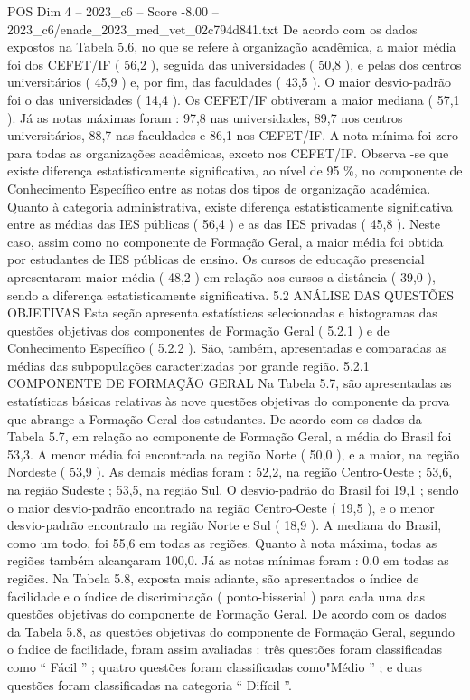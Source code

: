\begin{textsample}{POS Dim 4 – 2023\_c6 – Score -8.00 – 2023\_c6/enade\_2023\_med\_vet\_02c794d841.txt}
De acordo com os dados expostos na Tabela 5.6, no que se refere à organização acadêmica, a maior média foi dos CEFET/IF ( 56,2 ), seguida das universidades ( 50,8 ), e pelas dos centros universitários ( 45,9 ) e, por fim, das faculdades ( 43,5 ).
O maior desvio-padrão foi o das universidades ( 14,4 ).
Os CEFET/IF obtiveram a maior mediana ( 57,1 ).
Já as notas máximas foram : 97,8 nas universidades, 89,7 nos centros universitários, 88,7 nas faculdades e 86,1 nos CEFET/IF.
A nota mínima foi zero para todas as organizações acadêmicas, exceto nos CEFET/IF.
Observa -se que existe diferença estatisticamente significativa, ao nível de 95 \%, no componente de Conhecimento Específico entre as notas dos tipos de organização acadêmica.
Quanto à categoria administrativa, existe diferença estatisticamente significativa entre as médias das IES públicas ( 56,4 ) e as das IES privadas ( 45,8 ).
Neste caso, assim como no componente de Formação Geral, a maior média foi obtida por estudantes de IES públicas de ensino.
Os cursos de educação presencial apresentaram maior média ( 48,2 ) em relação aos cursos a distância ( 39,0 ), sendo a diferença estatisticamente significativa. 5.2 ANÁLISE DAS QUESTÕES OBJETIVAS Esta seção apresenta estatísticas selecionadas e histogramas das questões objetivas dos componentes de Formação Geral ( 5.2.1 ) e de Conhecimento Específico ( 5.2.2 ).
São, também, apresentadas e comparadas as médias das subpopulações caracterizadas por grande região. 5.2.1 COMPONENTE DE FORMAÇÃO GERAL Na Tabela 5.7, são apresentadas as estatísticas básicas relativas às nove questões objetivas do componente da prova que abrange a Formação Geral dos estudantes.
De acordo com os dados da Tabela 5.7, em relação ao componente de Formação Geral, a média do Brasil foi 53,3.
A menor média foi encontrada na região Norte ( 50,0 ), e a maior, na região Nordeste ( 53,9 ).
As demais médias foram : 52,2, na região Centro-Oeste ; 53,6, na região Sudeste ; 53,5, na região Sul.
O desvio-padrão do Brasil foi 19,1 ; sendo o maior desvio-padrão encontrado na região Centro-Oeste ( 19,5 ), e o menor desvio-padrão encontrado na região Norte e Sul ( 18,9 ).
A mediana do Brasil, como um todo, foi 55,6 em todas as regiões.
Quanto à nota máxima, todas as regiões também alcançaram 100,0.
Já as notas mínimas foram : 0,0 em todas as regiões.
Na Tabela 5.8, exposta mais adiante, são apresentados o índice de facilidade e o índice de discriminação ( ponto-bisserial ) para cada uma das questões objetivas do componente de Formação Geral.
De acordo com os dados da Tabela 5.8, as questões objetivas do componente de Formação Geral, segundo o índice de facilidade, foram assim avaliadas : três questões foram classificadas como “ Fácil ” ; quatro questões foram classificadas como"Médio ” ; e duas questões foram classificadas na categoria “ Difícil ”.

\end{textsample}
